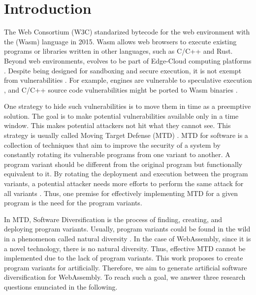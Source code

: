 \chapter{Introduction}
\label{chapter:intro}





The Web Consortium (W3C) standarized bytecode for the web environment with the \wasm (Wasm) language in 2015. 
Wasm allows web browsers to execute existing programs or libraries written in other languages, such as C/C++ and Rust.
Beyond web environments, \wasm evolves to be part of Edge-Cloud computing platforms \cite{9640153, wen2020wasmachine}. 
Despite being designed for sandboxing and secure execution, it is not exempt from vulnerabilities \cite{WebAssemblySecurity}.
For example, \wasm engines are vulnerable to speculative execution \cite{Narayan2021Swivel}, and C/C++ source code vulnerabilities might be ported to Wasm binaries \cite{DeRoover2022}.  

One strategy to hide such vulnerabilities is to move them in time as a preemptive solution.
The goal is to make potential vulnerabilities available only in a time window. This makes potential attackers not hit what they cannot see.  
This strategy is usually called Moving Target Defense (MTD) \cite{MTDNationalCyberLaep, okhravi2013survey}. 
MTD for software is a collection of techniques that aim to improve the security of a system by constantly rotating its vulnerable programs from one variant to another. 
A program variant should be different from the original program but functionally equivalent to it.
By rotating the deployment and execution between the program variants, a potential attacker needs more efforts to perform the same attack for all variants \cite{sengupta}.
Thus, one premise for effectively implementing MTD for a given program is the need for the program variants.


In MTD, Software Diversification is the process of finding, creating, and deploying program variants.
Usually, program variants could be found in the wild in a phenomenon called natural diversity \cite{Harrand1650630}. In the case of WebAssembly, since it is a novel technology, there is no natural diversity. Thus, effective MTD cannot be implemented due to the lack of program variants.
This work proposes to create program variants for \wasm artificially. 
Therefore, we aim to generate artificial software diversification for WebAssembly.
To reach such a goal, we answer three research questions enunciated in the following.

